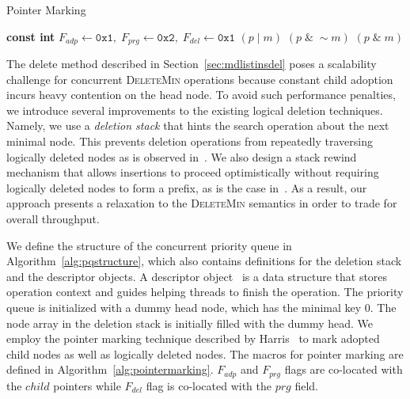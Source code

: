 \documentclass[10pt,journal,letterpaper,compsoc]{IEEEtran}
\begin{document}
\begin{algorithm}[ht]
    \caption{Pointer Marking}
    \label{alg:pointermarking}
    \begin{algorithmic}[1]
        \State \textbf{const int} $F_{adp} \gets \texttt{0x1},\;F_{prg} \gets \texttt{0x2},\;F_{del} \gets \texttt{0x1}$
         $(p\;|\;m)$
        \EndDefine
         $(p\;\&\;\sim m)$
        \EndDefine
         $(p\;\&\;m)$
        \EndDefine
    \end{algorithmic}
\end{algorithm}

The delete method described in Section~\ref{sec:mdlistinsdel} poses a scalability challenge for concurrent \textsc{DeleteMin} operations because constant child adoption incurs heavy contention on the head node. 
To avoid such performance penalties, we introduce several improvements to the existing logical deletion techniques. 
Namely, we use a \emph{deletion stack} that hints the search operation about the next minimal node. 
This prevents deletion operations from repeatedly traversing logically deleted nodes as is observed in~\cite{linden2013skiplist,shavit2000skiplist}.
We also design a stack rewind mechanism that allows insertions to proceed optimistically without requiring logically deleted nodes to form a prefix, as is the case in~\cite{linden2013skiplist}. 
As a result, our approach presents a relaxation to the \textsc{DeleteMin} semantics in order to trade for overall throughput. 


We define the structure of the concurrent priority queue in Algorithm~\ref{alg:pqstructure}, which also contains definitions for the deletion stack and the descriptor objects.
A descriptor object~\cite{herlihy2012art} is a data structure that stores operation context and guides helping threads to finish the operation.
The priority queue is initialized with a dummy head node, which has the minimal key 0.
The node array in the deletion stack is initially filled with the dummy head.
We employ the pointer marking technique described by Harris~\cite{harris2001pragmatic} to mark adopted child nodes as well as logically deleted nodes. 
The macros for pointer marking are defined in Algorithm~\ref{alg:pointermarking}.
$F_{adp}$ and $F_{prg}$ flags are co-located with the $child$ pointers while $F_{del}$ flag is co-located with the $prg$ field.
\end{document}
